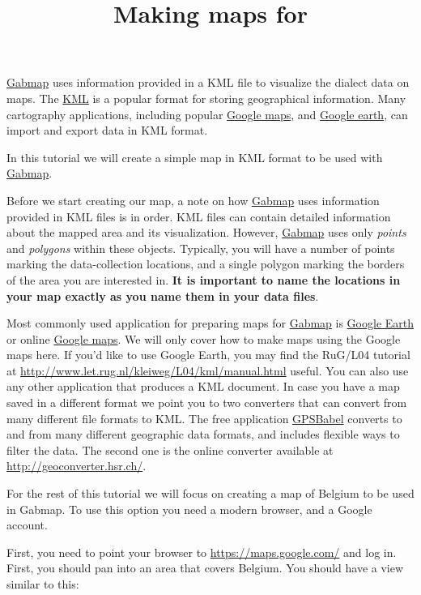 \documentclass{article}
\title{Making maps for \gabmap{}}
\date{}
\newcommand{\gabmap}{\href{http://www.gabmap.nl/}{Gabmap}}
\begin{document}
\maketitle{}

\gabmap{} uses information provided in a KML file to visualize the
dialect data on maps.  The
\href{http://en.wikipedia.org/wiki/Keyhole_Markup_Language}{KML} is a
popular format for storing geographical information. Many cartography
applications, including popular \href{https://maps.google.com/}{Google
maps}, and \href{http://http://www.google.com/earth/}{Google earth},
can import and export data in KML format.

In this tutorial we will create a simple map in KML format to be used
with \gabmap{}.

Before we start creating our map, a note on how \gabmap{} uses
information provided in KML files is in order. KML files can contain
detailed information about the mapped area and its visualization.
However, \gabmap{} uses only \emph{points} and \emph{polygons} within
these objects. Typically, you will have a number of points marking the
data-collection locations, and a single polygon marking the borders of
the area you are interested in. \textbf{It is important to name the
locations in your map exactly as you name them in your data files}.

Most commonly used application for preparing maps for \gabmap{} is
\href{http://http://www.google.com/earth/}{Google Earth} or online
\href{https://maps.google.com/}{Google maps}.  We will only cover how
to make maps using the Google maps here. If you'd like to use Google
Earth, you may find the RuG/L04 tutorial at
\url{http://www.let.rug.nl/kleiweg/L04/kml/manual.html} useful.  You
can also use any other application that produces a KML document. In
case you have a map saved in a different format we point you to two
converters that can convert from many different file formats to KML.
The free application \href{http://www.gpsbabel.org/}{GPSBabel}
converts to and from many different geographic data formats, and
includes flexible ways to filter the data.  The second one is the
online converter available at \url{http://geoconverter.hsr.ch/}. 

For the rest of this tutorial we will focus on creating a map of
Belgium to be used in Gabmap. To use this option you need a modern
browser, and a Google account.

First, you need to point your browser to
\url{https://maps.google.com/} and log in. First, you should pan into
an area that covers Belgium. You should have a view similar to this:
\end{document}
